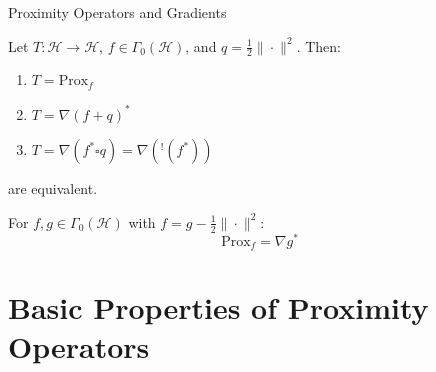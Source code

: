 \documentclass[aspectratio=169,10pt]{beamer}
\begin{document}
\begin{frame}{Proximity Operators and Gradients}
\begin{theorem}
Let $T: \mathcal{H} \to \mathcal{H}$, $f \in \Gamma_0(\mathcal{H})$, and $q = \frac{1}{2}\|\cdot\|^2$. Then:
\begin{enumerate}
    \item $T = \mathrm{Prox}_f$
    \item $T = \nabla(f + q)^*$
    \item $T = \nabla(f^* \square q) = \nabla({}^!(f^*))$
\end{enumerate}
are equivalent.
\end{theorem}

\vspace{0.3cm}

\begin{corollary}
For $f, g \in \Gamma_0(\mathcal{H})$ with $f = g - \frac{1}{2}\|\cdot\|^2$:
\[
\mathrm{Prox}_f = \nabla g^*
\]
\end{corollary}
\end{frame}

\section{Basic Properties of Proximity Operators}
\end{document}
